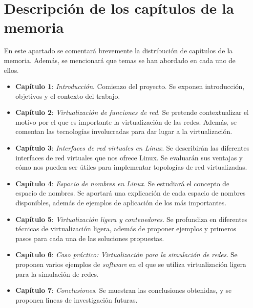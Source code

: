 \documentclass[a4paper, oneside, 12pt]{book}
\begin{document}
	\section[Resumen capítulos de la memoria]{Descripción de los capítulos de la memoria}
	\noindent En este apartado se comentará brevemente la distribución de capítulos de la memoria. Además, se mencionará que temas se han abordado en cada uno de ellos.
	\begin{itemize}
		\item \textbf{Capítulo 1}: \textit{Introducción}. Comienzo del proyecto. Se exponen introducción, objetivos y el contexto del trabajo. \\
		
		\item \textbf{Capítulo 2}: \textit{Virtualización de funciones de red}. Se pretende contextualizar el motivo por el que es importante la virtualización de las redes. Además, se comentan las tecnologías involucradas para dar lugar a la virtualización. \\
		
		\item \textbf{Capítulo 3}: \textit{Interfaces de red virtuales en Linux}. Se describirán las diferentes interfaces de red virtuales que nos ofrece Linux. Se evaluarán sus ventajas y cómo nos pueden ser útiles para implementar topologías de red virtualizadas. \\
		
		\item \textbf{Capítulo 4}: \textit{Espacio de nombres en Linux}. Se estudiará el concepto de espacio de nombres. Se aportará una explicación de cada espacio de nombres disponibles, además de ejemplos de aplicación de los más importantes. \\
		
		\item \textbf{Capítulo 5}: \textit{Virtualización ligera y contenedores}. Se profundiza en diferentes técnicas de virtualización ligera, además de proponer ejemplos y primeros pasos para cada una de las soluciones propuestas. \\
		
		
		\item \textbf{Capítulo 6}: \textit{Caso práctico: Virtualización para la simulación de redes}. Se proponen varios ejemplos de \textit{software} en el que se utiliza virtualización ligera para la simulación de redes. \\
		
		\item \textbf{Capítulo 7}: \textit{Conclusiones}. Se muestran las conclusiones obtenidas, y se proponen lineas de investigación futuras. \\
	\end{itemize}
	
\end{document}
